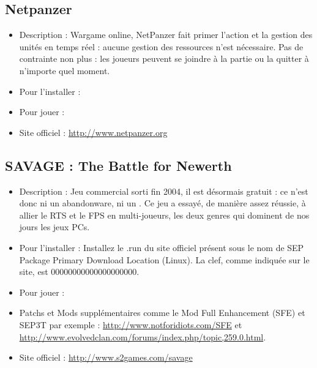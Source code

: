\subsection{Netpanzer}
\begin{itemize}
\begingroup
{}
\item Description : Wargame online, NetPanzer fait primer l'action et la gestion des unités en temps réel : aucune gestion des ressources n'est nécessaire. Pas de contrainte non plus : les joueurs peuvent se joindre à la partie ou la quitter à n'importe quel moment.{\par}
\item Pour l'installer : 
\item Pour jouer : 
\item Site officiel : \url{http://www.netpanzer.org}{\par}
\endgroup
\end{itemize}
\subsection{SAVAGE : The Battle for Newerth}
\begin{itemize}
\begingroup
{}
\item Description : Jeu commercial sorti fin 2004, il est désormais gratuit : ce n'est donc ni un abandonware, ni un . Ce jeu a essayé, de manière assez réussie, à allier le RTS et le FPS en multi-joueurs, les deux genres qui dominent de nos jours les jeux PCs.{\par}
\endgroup
\item Pour l'installer : Installez le .run du site officiel présent sous le nom de SEP Package Primary Download Location (Linux). La clef, comme indiquée sur le site, est 00000000000000000000.{\par}
\item Pour jouer : 
\item Patchs et Mods supplémentaires comme le Mod Full Enhancement (SFE) et SEP3T par exemple : \url{http://www.notforidiots.com/SFE} et \url{http://www.evolvedclan.com/forums/index.php/topic,259.0.html}.{\par}
\item Site officiel : \url{http://www.s2games.com/savage}{\par}
\end{itemize}
\newpage
